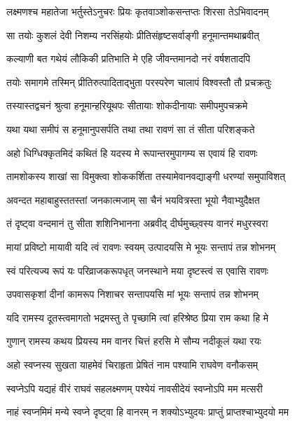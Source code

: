 \twolineshloka
{लक्ष्मणश्च महातेजा भर्तुस्तेऽनुचरः प्रियः}
{कृतवाञ्शोकसन्तप्तः शिरसा तेऽभिवादनम्} %

\twolineshloka
{सा तयोः कुशलं देवी निशम्य नरसिंहयोः}
{प्रीतिसंहृष्टसर्वाङ्गी हनूमान्तमथाब्रवीत्} %

\twolineshloka
{कल्याणी बत गथेयं लौकिकी प्रतिभाति मे}
{एहि जीवन्तमानदो नरं वर्षशतादपि} %

\twolineshloka
{तयोः समागमे तस्मिन् प्रीतिरुत्पादिताद्भुता}
{परस्परेण चालापं विश्वस्तौ तौ प्रचक्रतुः} %

\twolineshloka
{तस्यास्तद्वचनं श्रुत्वा हनूमान्हरियूथपः}
{सीतायाः शोकदीनायाः समीपमुपचक्रमे} %

\twolineshloka
{यथा यथा समीपं स हनूमानुपसर्पति}
{तथा तथा रावणं सा तं सीता परिशङ्कते} %

\twolineshloka
{अहो धिग्धिक्कृतमिदं कथितं हि यदस्य मे}
{रूपान्तरमुपागम्य स एवायं हि रावणः} %

\twolineshloka
{तामशोकस्य शाखां सा विमुक्त्वा शोककर्शिता}
{तस्यामेवानवद्याङ्गी धरण्यां समुपाविशत्} %

\twolineshloka
{अवन्दत महाबाहुस्ततस्तां जनकात्मजाम्}
{सा चैनं भयवित्रस्ता भूयो नैवाभ्युदैक्षत} %

\twolineshloka
{तं दृष्ट्वा वन्दमानं तु सीता शशिनिभानना}
{अब्रवीद् दीर्घमुच्छ्वस्य वानरं मधुरस्वरा} %

\twolineshloka
{मायां प्रविष्टो मायावी यदि त्वं रावणः स्वयम्}
{उत्पादयसि मे भूयः सन्तापं तन्न शोभनम्} %

\twolineshloka
{स्वं परित्यज्य रूपं यः परिव्राजकरूपधृत्}
{जनस्थाने मया दृष्टस्त्वं स एवासि रावणः} %

\twolineshloka
{उपवासकृशां दीनां कामरूप निशाचर}
{सन्तापयसि मां भूयः सन्तापं तन्न शोभनम्} %

\twolineshloka
{यदि रामस्य दूतस्त्वमागतो भद्रमस्तु ते}
{पृच्छामि त्वां हरिश्रेष्ठ प्रिया राम कथा हि मे} %

\twolineshloka
{गुणान् रामस्य कथय प्रियस्य मम वानर}
{चित्तं हरसि मे सौम्य नदीकूलं यथा रयः} %

\twolineshloka
{अहो स्वप्नस्य सुखता याहमेवं चिराहृता}
{प्रेषितं नाम पश्यामि राघवेण वनौकसम्} %

\twolineshloka
{स्वप्नेऽपि यद्यहं वीरं राघवं सहलक्ष्मणम्}
{पश्येयं नावसीदेयं स्वप्नोऽपि मम मत्सरी} %

\twolineshloka
{नाहं स्वप्नमिमं मन्ये स्वप्ने दृष्ट्वा हि वानरम्}
{न शक्योऽभ्युदयः प्राप्तुं प्राप्तश्चाभ्युदयो मम} %

